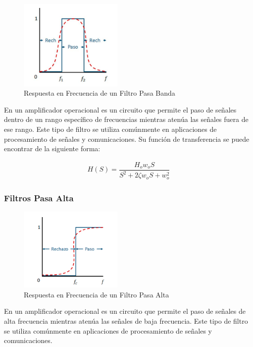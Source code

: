             \begin{figure}[H]
                \centering
                \includegraphics[width=5cm]{Imagenes/pasa_banda.png}
                \caption{Respuesta en Frecuencia de un Filtro Pasa Banda}
                \label{fig:pasa_banda}
            \end{figure} 

            En un amplificador operacional es un circuito que permite el paso de señales dentro de un rango específico de frecuencias mientras atenúa las señales fuera de ese rango. Este tipo de filtro se utiliza comúnmente en aplicaciones de procesamiento de señales y comunicaciones. Su función de transferencia se puede encontrar de la siguiente forma:

            
            \begin{gather}
                H(S)=\dfrac{H_ow_oS}{S^2+2\zeta w_oS+w_o^2}
            \end{gather}

        \subsubsection{Filtros Pasa Alta}

            \begin{figure}[H]
                \centering
                \includegraphics[width=5cm]{Imagenes/pasa_alta.png}
                \caption{Respuesta en Frecuencia de un Filtro Pasa Alta}
                \label{fig:pasa_alta}
            \end{figure} 

            En un amplificador operacional es un circuito que permite el paso de señales de alta frecuencia mientras atenúa las señales de baja frecuencia. Este tipo de filtro se utiliza comúnmente en aplicaciones de procesamiento de señales y comunicaciones. 
            
